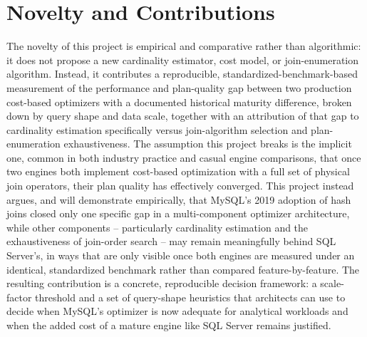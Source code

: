 \documentclass[conference]{IEEEtran}
\begin{document}
\section{Novelty and Contributions}
The novelty of this project is empirical and comparative rather than algorithmic: it does not propose a new cardinality estimator, cost model, or join-enumeration algorithm. Instead, it contributes a reproducible, standardized-benchmark-based measurement of the performance and plan-quality gap between two production cost-based optimizers with a documented historical maturity difference, broken down by query shape and data scale, together with an attribution of that gap to cardinality estimation specifically versus join-algorithm selection and plan-enumeration exhaustiveness. The assumption this project breaks is the implicit one, common in both industry practice and casual engine comparisons, that once two engines both implement cost-based optimization with a full set of physical join operators, their plan quality has effectively converged. This project instead argues, and will demonstrate empirically, that MySQL's 2019 adoption of hash joins closed only one specific gap in a multi-component optimizer architecture, while other components -- particularly cardinality estimation and the exhaustiveness of join-order search -- may remain meaningfully behind SQL Server's, in ways that are only visible once both engines are measured under an identical, standardized benchmark rather than compared feature-by-feature. The resulting contribution is a concrete, reproducible decision framework: a scale-factor threshold and a set of query-shape heuristics that architects can use to decide when MySQL's optimizer is now adequate for analytical workloads and when the added cost of a mature engine like SQL Server remains justified.
\end{document}
